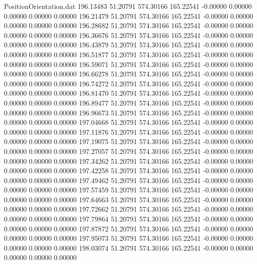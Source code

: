 \begin{filecontents}{PositionOrientation.dat}
 196.13483   51.20791  574.30166   165.22541   -0.00000    0.00000    0.00000    0.00000    0.00000
 196.21479   51.20791  574.30166   165.22541   -0.00000    0.00000    0.00000    0.00000    0.00000
 196.28682   51.20791  574.30166   165.22541   -0.00000    0.00000    0.00000    0.00000    0.00000
 196.36676   51.20791  574.30166   165.22541   -0.00000    0.00000    0.00000    0.00000    0.00000
 196.43879   51.20791  574.30166   165.22541   -0.00000    0.00000    0.00000    0.00000    0.00000
 196.51877   51.20791  574.30166   165.22541   -0.00000    0.00000    0.00000    0.00000    0.00000
 196.59071   51.20791  574.30166   165.22541   -0.00000    0.00000    0.00000    0.00000    0.00000
 196.66278   51.20791  574.30166   165.22541   -0.00000    0.00000    0.00000    0.00000    0.00000
 196.74272   51.20791  574.30166   165.22541   -0.00000    0.00000    0.00000    0.00000    0.00000
 196.81470   51.20791  574.30166   165.22541   -0.00000    0.00000    0.00000    0.00000    0.00000
 196.89477   51.20791  574.30166   165.22541   -0.00000    0.00000    0.00000    0.00000    0.00000
 196.96673   51.20791  574.30166   165.22541   -0.00000    0.00000    0.00000    0.00000    0.00000
 197.04668   51.20791  574.30166   165.22541   -0.00000    0.00000    0.00000    0.00000    0.00000
 197.11876   51.20791  574.30166   165.22541   -0.00000    0.00000    0.00000    0.00000    0.00000
 197.19075   51.20791  574.30166   165.22541   -0.00000    0.00000    0.00000    0.00000    0.00000
 197.27057   51.20791  574.30166   165.22541   -0.00000    0.00000    0.00000    0.00000    0.00000
 197.34262   51.20791  574.30166   165.22541   -0.00000    0.00000    0.00000    0.00000    0.00000
 197.42258   51.20791  574.30166   165.22541   -0.00000    0.00000    0.00000    0.00000    0.00000
 197.49462   51.20791  574.30166   165.22541   -0.00000    0.00000    0.00000    0.00000    0.00000
 197.57459   51.20791  574.30166   165.22541   -0.00000    0.00000    0.00000    0.00000    0.00000
 197.64663   51.20791  574.30166   165.22541   -0.00000    0.00000    0.00000    0.00000    0.00000
 197.72662   51.20791  574.30166   165.22541   -0.00000    0.00000    0.00000    0.00000    0.00000
 197.79864   51.20791  574.30166   165.22541   -0.00000    0.00000    0.00000    0.00000    0.00000
 197.87872   51.20791  574.30166   165.22541   -0.00000    0.00000    0.00000    0.00000    0.00000
 197.95073   51.20791  574.30166   165.22541   -0.00000    0.00000    0.00000    0.00000    0.00000
 198.03074   51.20791  574.30166   165.22541   -0.00000    0.00000    0.00000    0.00000    0.00000

\end{filecontents}
